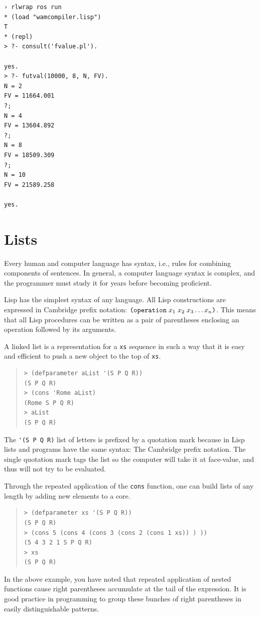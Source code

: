 \documentclass[a4paper,12pt]{book}
\begin{document}
\begin{verbatim}
› rlwrap ros run
* (load "wamcompiler.lisp")
T
* (repl)
> ?- consult('fvalue.pl').

yes.
> ?- futval(10000, 8, N, FV).
N = 2
FV = 11664.001
?;
N = 4
FV = 13604.892
?;
N = 8
FV = 18509.309
?;
N = 10
FV = 21589.258

yes.
\end{verbatim}

\pagebreak
\section{Lists}
Every human and computer language
has syntax, i.e., rules for combining
components of sentences.
In general, a computer language
syntax is complex, and the programmer
must study it for years before
becoming proficient.

Lisp has the simplest syntax
of any language. All
Lisp constructions are expressed
in Cambridge prefix notation:
$\verb|(operation|\;x_1\;x_2\;x_3\ldots x_n\verb|)|$.
This means that all Lisp procedures  can be written 
as a pair of parentheses enclosing an operation
followed by its arguments. 

A linked list is a representation for
a \verb|xs| sequence  in such a way
that it is easy and efficient to
push a new object to the top of \verb|xs|.
\begin{quote}
\begin{verbatim}
> (defparameter aList '(S P Q R))
(S P Q R)
> (cons 'Rome aList)
(Rome S P Q R)
> aList
(S P Q R)
\end{verbatim}
\end{quote}
The \verb|'(S P Q R)| list of letters
is prefixed by a quotation mark because
in Lisp lists and programs have the
same syntax: The Cambridge prefix notation.
The single quotation mark
tags the list so the computer will
take it at face-value, and thus will
not try to be evaluated.

Through the repeated application of the
\verb|cons| function, one can
build lists of any length
by adding new elements to
a core.
\begin{quote}
\begin{verbatim}
> (defparameter xs '(S P Q R))
(S P Q R)
> (cons 5 (cons 4 (cons 3 (cons 2 (cons 1 xs)) ) ))
(5 4 3 2 1 S P Q R)
> xs
(S P Q R)
\end{verbatim}
\end{quote}
In the above example, you have noted
that repeated application of nested functions
cause right parentheses accumulate
at the tail of the expression.
It is good practice in programming
to group these bunches of right parentheses
in easily distinguishable patterns.
\end{document}
